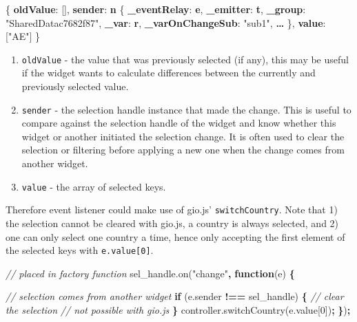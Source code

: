 \documentclass[
]{krantz}
\makeatletter
\newenvironment{Shaded}{\begin{snugshade}}{\end{snugshade}}
\newcommand{\AttributeTok}[1]{\textcolor[rgb]{0.61,0.61,0.61}{#1}}
\newcommand{\CommentTok}[1]{\textcolor[rgb]{0.37,0.37,0.37}{\textit{#1}}}
\newcommand{\ControlFlowTok}[1]{\textcolor[rgb]{0.27,0.27,0.27}{\textbf{#1}}}
\newcommand{\DecValTok}[1]{\textcolor[rgb]{0.06,0.06,0.06}{#1}}
\newcommand{\ErrorTok}[1]{\textcolor[rgb]{0.14,0.14,0.14}{\textbf{#1}}}
\newcommand{\FunctionTok}[1]{\textcolor[rgb]{0,0,0}{#1}}
\newcommand{\KeywordTok}[1]{\textcolor[rgb]{0.27,0.27,0.27}{\textbf{#1}}}
\newcommand{\NormalTok}[1]{#1}
\newcommand{\OperatorTok}[1]{\textcolor[rgb]{0.43,0.43,0.43}{\textbf{#1}}}
\newcommand{\OtherTok}[1]{\textcolor[rgb]{0.37,0.37,0.37}{#1}}
\newcommand{\StringTok}[1]{\textcolor[rgb]{0.5,0.5,0.5}{#1}}
\newcommand{\VariableTok}[1]{\textcolor[rgb]{0,0,0}{#1}}
\providecommand{\tightlist}{%
  \setlength{\itemsep}{0pt}\setlength{\parskip}{0pt}}
\newenvironment{kframe}{%
\medskip{}
\setlength{\fboxsep}{.8em}
 \def\at@end@of@kframe{}%
 \ifinner\ifhmode%
  \def\at@end@of@kframe{\end{minipage}}%
  \begin{minipage}{\columnwidth}%
 \fi\fi%
 \def\FrameCommand##1{\hskip\@totalleftmargin \hskip-\fboxsep
 \colorbox{shadecolor}{##1}\hskip-\fboxsep
     \hskip-\linewidth \hskip-\@totalleftmargin \hskip\columnwidth}%
 \MakeFramed {\advance\hsize-\width
   \@totalleftmargin\z@ \linewidth\hsize
   \@setminipage}}%
 {\par\unskip\endMakeFramed%
 \at@end@of@kframe}
\renewenvironment{Shaded}{\begin{kframe}}{\end{kframe}}
\makeatother
\begin{document}
\begin{Shaded}
\begin{Highlighting}[]
\FunctionTok{\{}
  \ErrorTok{oldValue}\FunctionTok{:} \OtherTok{[]}\FunctionTok{,}
  \ErrorTok{sender}\FunctionTok{:} \ErrorTok{n} \FunctionTok{\{}
    \ErrorTok{\_eventRelay}\FunctionTok{:} \ErrorTok{e}\FunctionTok{,} 
    \ErrorTok{\_emitter}\FunctionTok{:} \ErrorTok{t}\FunctionTok{,} 
    \ErrorTok{\_group}\FunctionTok{:} \StringTok{"SharedDatac7682f87"}\FunctionTok{,} 
    \ErrorTok{\_var}\FunctionTok{:} \ErrorTok{r}\FunctionTok{,} 
    \ErrorTok{\_varOnChangeSub}\FunctionTok{:} \StringTok{"sub1"}\FunctionTok{,} 
    \ErrorTok{…}
  \FunctionTok{\},}
  \ErrorTok{value}\FunctionTok{:} \OtherTok{[}\StringTok{"AE"}\OtherTok{]}
\FunctionTok{\}}
\end{Highlighting}
\end{Shaded}

\begin{enumerate}
\def\labelenumi{\arabic{enumi}.}
\tightlist
\item
  \texttt{oldValue} - the value that was previously selected (if any), this may be useful if the widget wants to calculate differences between the currently and previously selected value.
\item
  \texttt{sender} - the selection handle instance that made the change. This is useful to compare against the selection handle of the widget and know whether this widget or another initiated the selection change. It is often used to clear the selection or filtering before applying a new one when the change comes from another widget.
\item
  \texttt{value} - the array of selected keys.
\end{enumerate}

Therefore event listener could make use of gio.js' \texttt{switchCountry}. Note that 1) the selection cannot be cleared with gio.js, a country is always selected, and 2) one can only select one country a time, hence only accepting the first element of the selected keys with \texttt{e.value{[}0{]}}.

\begin{Shaded}
\begin{Highlighting}[]
\CommentTok{// placed in factory function}
\VariableTok{sel\_handle}\NormalTok{.}\AttributeTok{on}\NormalTok{(}\StringTok{"change"}\OperatorTok{,} \KeywordTok{function}\NormalTok{(e) }\OperatorTok{\{}

  \CommentTok{// selection comes from another widget}
  \ControlFlowTok{if}\NormalTok{ (}\VariableTok{e}\NormalTok{.}\AttributeTok{sender} \OperatorTok{!==}\NormalTok{ sel\_handle) }\OperatorTok{\{}
    \CommentTok{// clear the selection}
    \CommentTok{// not possible with gio.js}
  \OperatorTok{\}}
  \VariableTok{controller}\NormalTok{.}\AttributeTok{switchCountry}\NormalTok{(}\VariableTok{e}\NormalTok{.}\AttributeTok{value}\NormalTok{[}\DecValTok{0}\NormalTok{])}\OperatorTok{;}
\OperatorTok{\}}\NormalTok{)}\OperatorTok{;}
\end{Highlighting}
\end{Shaded}
\end{document}
